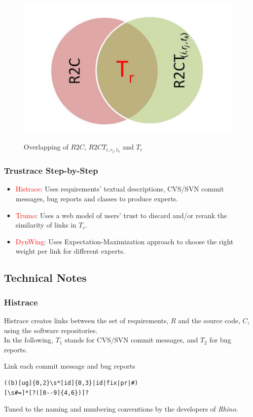 \documentclass[12pt,hyperref=true,mathserif]{beamer}
\begin{document}
\begin{frame}
\begin{figure}
  \centering
  \includegraphics[scale=0.4]{Overlap}\\
  \caption{Overlapping of $R2C$, $R2CT_{i,r_{j},t_{k}}$ and $T_{r}$}\label{fig:Overlap}
\end{figure}
\end{frame}

\begin{frame}
\frametitle{Trustrace Step-by-Step}
\begin{itemize}
  \item \textcolor{red}{Histrace}: Uses requirements' textual descriptions, CVS/SVN commit messages, bug reports and classes to produce experts.\\[12pt]
  \item \textcolor{red}{Trumo}: Uses a web model of users' trust to discard and/or rerank the similarity of links in $T_{r}$.\\[12pt]
  \item \textcolor{red}{DynWing}: Uses Expectation-Maximization approach to choose the right weight per link for different experts.
\end{itemize}
\end{frame}

\subsection*{Technical Notes}


\begin{frame}
  \frametitle{Histrace}
  Histrace creates links between the set of requirements, $R$ and the
  source code, $C$, using the software repositories.\\
  In the following, $T_{1}$ stands for CVS/SVN commit messages, and
  $T_{2}$ for bug reports.\\[6pt]
  \begin{block}{Link each commit message and bug reports}
\begin{verbatim}
((b)[ug]{0,2}\s*[id]{0,3}|id|fix|pr|#)
[\s#=]*[?([0--9]{4,6})]?
\end{verbatim} 
  \end{block}
Tuned to the naming and numbering conventions by the developers of
\emph{Rhino}.
\end{frame}
\end{document}
